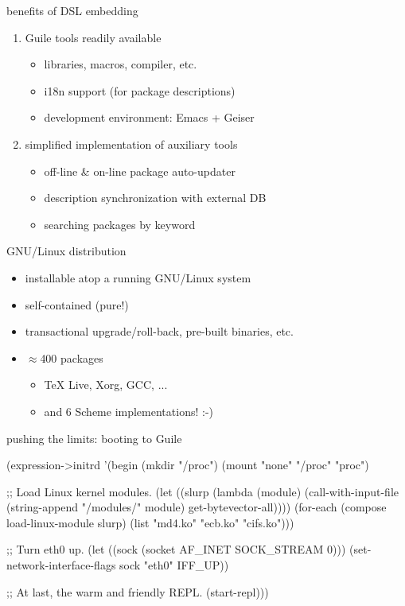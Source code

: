 \documentclass{beamer}
\begin{document}
\begin{frame}{benefits of DSL embedding}
  \begin{enumerate}
    \item{Guile tools readily available
        \begin{itemize}
          \item<2-> libraries, macros, compiler, etc.
          \item<2-> i18n support (for package descriptions)
          \item<2-> development environment: Emacs + Geiser
        \end{itemize}}
    \item{simplified implementation of auxiliary tools
        \begin{itemize}
          \item<2-> off-line \& on-line package auto-updater
          \item<2-> description synchronization with external DB
          \item<2-> searching packages by keyword
        \end{itemize}}
  \end{enumerate}
\end{frame}

\begin{frame}{GNU/Linux distribution}
  \begin{itemize}
    \item installable atop a running GNU/Linux system
    \item self-contained (pure!)
    \item transactional upgrade/roll-back, pre-built binaries, etc.
    \item {$\approx$400 packages
        \begin{itemize}
          \item TeX Live, Xorg, GCC, ...
          \item and 6 Scheme implementations! :-)
        \end{itemize}}
  \end{itemize}
\end{frame}

\begin{frame}[fragile]{pushing the limits: booting to Guile}
  \vspace{-0.7cm}
  \begin{semiverbatim}
\small{
(\alert{expression->initrd}
 '(begin
    (mkdir "/proc")
    (mount "none" "/proc" "proc")

    ;; Load Linux kernel modules.
    (let ((slurp (lambda (module)
                   (call-with-input-file
                       (string-append "/modules/" module)
                     get-bytevector-all))))
      (for-each (compose load-linux-module slurp)
                (list "md4.ko" "ecb.ko" "cifs.ko")))

    ;; Turn eth0 up.
    (let ((sock (socket AF_INET SOCK_STREAM 0)))
      (set-network-interface-flags sock "eth0" IFF_UP))

    ;; At last, the warm and friendly REPL.
    (start-repl)))
}
  \end{semiverbatim}
\end{frame}
\end{document}
